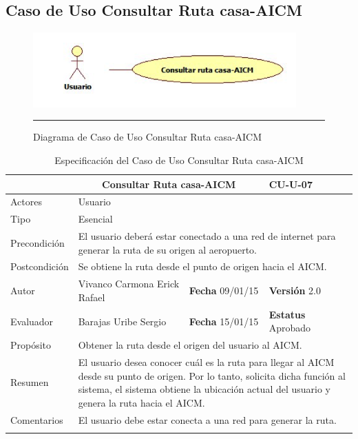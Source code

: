 \subsection{Caso de Uso Consultar Ruta casa-AICM}

\begin{figure}[htbp]
	\centering
		\includegraphics[width=0.9\textwidth]{Figuras/cuConsultarRutacasa-AICM.png}
		\rule{30em}{0.5pt}
	\caption[Diagrama de Caso de Uso Consultar Ruta casa-AICM]{Diagrama de Caso de Uso Consultar Ruta casa-AICM}
	\label{fig:cuConsultarRutacasa-AICM}
\end{figure}

\begin{longtable}{|p{2.5cm}|p{6.4cm}|p{2cm}|p{2cm}|}
	\hline
		\rowcolor[RGB]{51,153,255}{Caso de Uso}&\multicolumn{2}{c}{Consultar Ruta casa-AICM}&{\textbf{CU-U-07}}\\
	\hline
		{Actores}&\multicolumn{3}{p{11.2cm}|}{Usuario}\\
	\hline
		{Tipo}&\multicolumn{3}{p{11.2cm}|}{Esencial}\\
	\hline
		{Precondición}&\multicolumn{3}{p{11.2cm}|}{El usuario deberá estar conectado a una red de internet para generar la ruta de su origen al aeropuerto.}\\
	\hline
		{Postcondición}&\multicolumn{3}{p{11.2cm}|}{Se obtiene la ruta desde el punto de origen hacia el AICM.}\\
	\hline
		{Autor}&{Vivanco Carmona Erick Rafael}&{\textbf{Fecha} 09/01/15}&{\textbf{Versión} 2.0}\\
			\hline
		{Evaluador}&{Barajas Uribe Sergio}&{\textbf{Fecha} 15/01/15}&{\textbf{Estatus} Aprobado}\\
	\hline
		{Propósito}&\multicolumn{3}{p{11.2cm}|}{Obtener la ruta desde el origen del usuario al AICM.}\\
	\hline
		{Resumen}&\multicolumn{3}{p{11.2cm}|}{El usuario desea conocer cuál es la ruta para llegar al AICM desde su punto de origen. Por lo tanto, solicita dicha función al sistema, el sistema obtiene la ubicación actual del usuario y  genera la ruta hacia el AICM.}\\	
	\hline
		{Comentarios}&\multicolumn{3}{p{11.2cm}|}{El usuario debe estar conecta a una red para generar la ruta.}\\
	\hline
	\caption[Especificación del Caso de Uso Consultar Ruta casa-AICM]{Especificación del Caso de Uso Consultar Ruta casa-AICM}
    	\label{tab:cuConsultarRutacasa-AICM}
\end{longtable}

